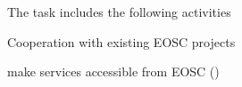 \begin{task}[
  title=Collaboration with EOSC,
  id=eosc,
  lead=EGI,
  PM=33,
  wphases={12-48},
  partners={SRL,XFEL,WTT}
]
  The task includes the following activities

  \begin{compactitem}
  \item Cooperation with existing EOSC projects
  \item make services accessible from EOSC
    ()
  \end{compactitem}
\end{task}

